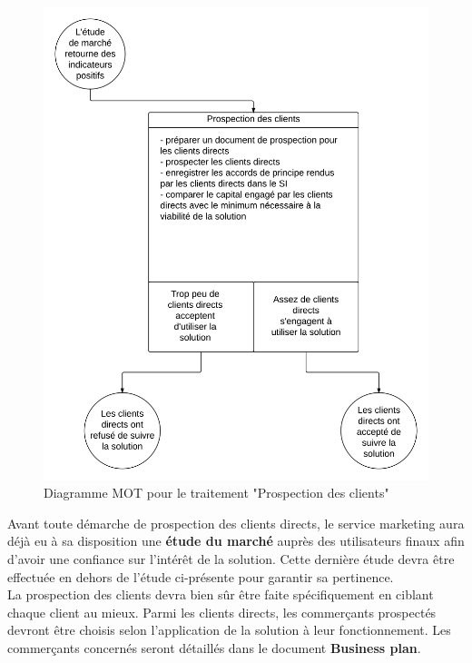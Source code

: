 \begin{figure}[ht]
    \centering
    \includegraphics[width=\textwidth]{mot-prospection-clients}
    \caption{Diagramme MOT pour le traitement "Prospection des clients"}
    \label{fig:mot-prospection-clients}
\end{figure}

Avant toute démarche de prospection des clients directs, le service marketing
aura déjà eu à sa disposition une \textbf{étude du marché} auprès des
utilisateurs finaux afin d'avoir une confiance sur l'intérêt de la solution.
Cette dernière étude devra être effectuée en dehors de l'étude ci-présente pour
garantir sa pertinence. \\

La prospection des clients devra bien sûr être faite spécifiquement en ciblant
chaque client au mieux. Parmi les clients directs, les commerçants prospectés
devront être choisis selon l'application de la solution à leur fonctionnement.
Les commerçants concernés seront détaillés dans le document \textbf{Business
plan}.


